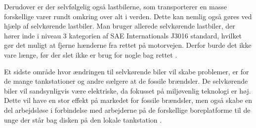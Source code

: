 Derudover er der selvfølgelig også lastbilerne, som transporterer en masse forskellige varer rundt omkring over alt i verden. Dette kan nemlig også gøres ved hjælp af selvkørende lastbiler. Man bruger allerede selvkørende lastbiler, der hører inde i niveau 3 kategorien af SAE Internationals J3016 standard, hvilket gør det muligt at fjerne hænderne fra rettet på motorvejen. Derfor burde det ikke vare længe, før der slet ikke er brug for nogle bag rettet \cite{TRUCKS}. 

Et sidste område hvor ændringen til selvkørende biler vil skabe problemer, er for de mange tankstationer og andre sælgere at de fossile brændsler. De selvkørende biler vil sandsynligvis være elektriske, da fokusset på miljøvenlig teknologi er høj. Dette vil have en stor effekt på markedet for fossile brændsler, men også skabe en del arbejdsløse i forbindelse med arbejderne på de forskellige boreplatforme til de unge der står bag disken på den lokale tankstation \cite{GAS}.
